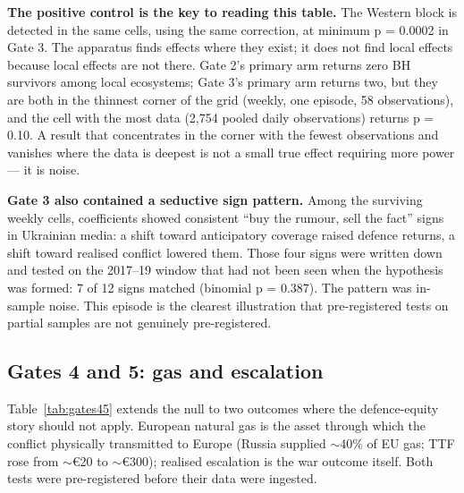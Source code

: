 \documentclass[12pt,a4paper]{article}
\begin{document}
\textbf{The positive control is the key to reading this table.} The Western block is detected in the same cells, using the same correction, at minimum p = 0.0002 in Gate 3. The apparatus finds effects where they exist; it does not find local effects because local effects are not there. Gate 2's primary arm returns zero BH survivors among local ecosystems; Gate 3's primary arm returns two, but they are both in the thinnest corner of the grid (weekly, one episode, 58 observations), and the cell with the most data (2,754 pooled daily observations) returns p = 0.10. A result that concentrates in the corner with the fewest observations and vanishes where the data is deepest is not a small true effect requiring more power --- it is noise.

\textbf{Gate 3 also contained a seductive sign pattern.} Among the surviving weekly cells, coefficients showed consistent ``buy the rumour, sell the fact'' signs in Ukrainian media: a shift toward anticipatory coverage raised defence returns, a shift toward realised conflict lowered them. Those four signs were written down and tested on the 2017--19 window that had not been seen when the hypothesis was formed: 7 of 12 signs matched (binomial p = 0.387). The pattern was in-sample noise. This episode is the clearest illustration that pre-registered tests on partial samples are not genuinely pre-registered.

\subsection{Gates 4 and 5: gas and escalation}
\label{sec:gates45}

Table~\ref{tab:gates45} extends the null to two outcomes where the defence-equity story should not apply. European natural gas is the asset through which the conflict physically transmitted to Europe (Russia supplied $\sim$40\% of EU gas; TTF rose from $\sim$\euro{}20 to $\sim$\euro{}300); realised escalation is the war outcome itself. Both tests were pre-registered before their data were ingested.
\end{document}
